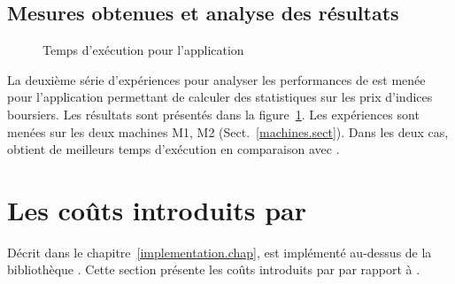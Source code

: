 \subsection{Mesures obtenues et analyse des r\'esultats}


\mydata

\begin{figure}[H]
\centering
    \caption{Temps d'ex\'ecution pour l'application }
    \label{executionTimesStockPrice.fig}
\end{figure}


La deuxi\`eme s\'erie d'exp\'eriences pour analyser les performances de \PpFf{} est men\'ee pour l'application permettant de calculer des statistiques sur les prix d'indices boursiers. Les r\'esultats sont pr\'esent\'es dans la figure~\ref{executionTimesStockPrice.fig}. Les expériences sont menées sur les deux machines M1, M2 (Sect.~\ref{machines.sect}). Dans les deux cas,  obtient de meilleurs temps d'ex\'ecution en comparaison avec .


\section{Les co\^uts introduits par }
\label{coutsPpFf.sect}

D\'ecrit dans le chapitre~\ref{implementation.chap},  est impl\'ement\'e au-dessus de la biblioth\`eque . Cette section pr\'esente les co\^uts introduits par  par rapport \`a . 


